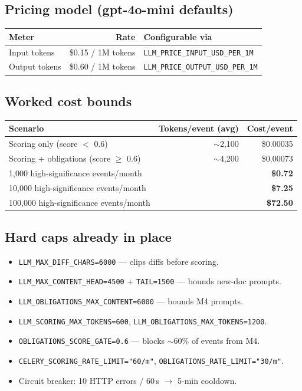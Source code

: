 \documentclass[11pt,a4paper]{article}
\begin{document}
\subsection{Pricing model (gpt-4o-mini defaults)}

\begin{center}
\small
\begin{tabular}{lrl}
\toprule
Meter & Rate & Configurable via \\
\midrule
Input tokens    & \$0.15 / 1M tokens & \texttt{LLM\_PRICE\_INPUT\_USD\_PER\_1M} \\
Output tokens   & \$0.60 / 1M tokens & \texttt{LLM\_PRICE\_OUTPUT\_USD\_PER\_1M} \\
\bottomrule
\end{tabular}
\end{center}

\subsection{Worked cost bounds}

\begin{center}
\small
\begin{tabular}{lrr}
\toprule
Scenario & Tokens/event (avg) & Cost/event \\
\midrule
Scoring only (score $<$ 0.6)           & $\sim$2{,}100  & \$0.00035 \\
Scoring + obligations (score $\geq$ 0.6) & $\sim$4{,}200  & \$0.00073 \\
\midrule
1{,}000 high-significance events/month  &                & \textbf{\$0.72} \\
10{,}000 high-significance events/month &                & \textbf{\$7.25} \\
100{,}000 high-significance events/month&                & \textbf{\$72.50} \\
\bottomrule
\end{tabular}
\end{center}

\subsection{Hard caps already in place}

\begin{itemize}[leftmargin=1.4em,itemsep=2pt]
  \item \texttt{LLM\_MAX\_DIFF\_CHARS=6000} --- clips diffs before scoring.
  \item \texttt{LLM\_MAX\_CONTENT\_HEAD=4500} + \texttt{TAIL=1500} --- bounds new-doc prompts.
  \item \texttt{LLM\_OBLIGATIONS\_MAX\_CONTENT=6000} --- bounds M4 prompts.
  \item \texttt{LLM\_SCORING\_MAX\_TOKENS=600}, \texttt{LLM\_OBLIGATIONS\_MAX\_TOKENS=1200}.
  \item \texttt{OBLIGATIONS\_SCORE\_GATE=0.6} --- blocks $\sim$60\% of events from M4.
  \item \texttt{CELERY\_SCORING\_RATE\_LIMIT="60/m"}, \texttt{OBLIGATIONS\_RATE\_LIMIT="30/m"}.
  \item Circuit breaker: 10 HTTP errors / 60\,s $\rightarrow$ 5-min cooldown.
\end{itemize}
\end{document}
